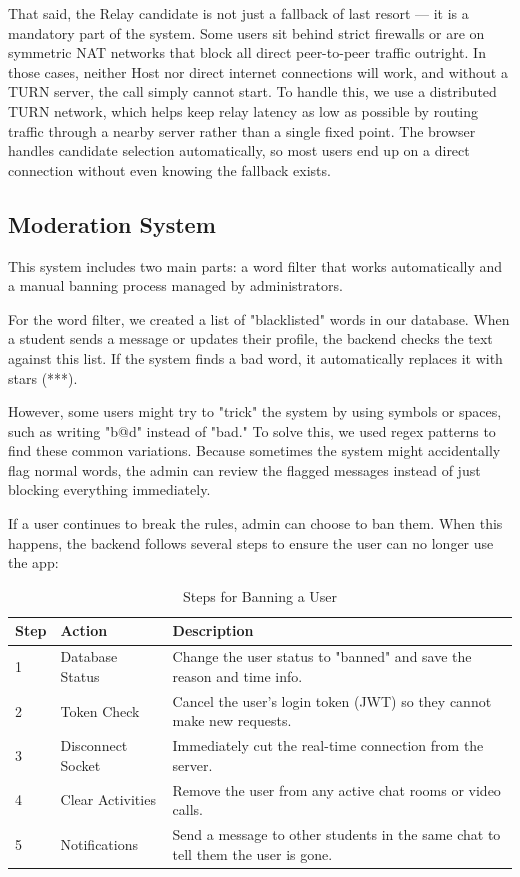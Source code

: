 \documentclass[a4paper,12pt]{report}
\begin{document}
That said, the Relay candidate is not just a fallback of last resort — it is a mandatory part of the system. Some users sit behind strict firewalls or are on symmetric NAT networks that block all direct peer-to-peer traffic outright. In those cases, neither Host nor direct internet connections will work, and without a TURN server, the call simply cannot start. To handle this, we use a distributed TURN network, which helps keep relay latency as low as possible by routing traffic through a nearby server rather than a single fixed point. The browser handles candidate selection automatically, so most users end up on a direct connection without even knowing the fallback exists.


\subsection{Moderation System}

This system includes two main parts: a word filter that works automatically and a manual banning process managed by administrators.

For the word filter, we created a list of "blacklisted" words in our database. When a student sends a message or updates their profile, the backend checks the text against this list. If the system finds a bad word, it automatically replaces it with stars (***). 

However, some users might try to "trick" the system by using symbols or spaces, such as writing "b@d" instead of "bad." To solve this, we used regex patterns to find these common variations. Because sometimes the system might accidentally flag normal words, the admin can review the flagged messages instead of just blocking everything immediately.

If a user continues to break the rules, admin can choose to ban them. When this happens, the backend follows several steps to ensure the user can no longer use the app:

\begin{table}[H]
\centering
\begin{tabular}{|p{1cm}|p{3.5cm}|p{9.5cm}|}
\hline
\textbf{Step} & \textbf{Action} & \textbf{Description} \\
\hline
1 & Database Status & Change the user status to "banned" and save the reason and time info. \\
\hline
2 & Token Check & Cancel the user's login token (JWT) so they cannot make new requests. \\
\hline
3 & Disconnect Socket & Immediately cut the real-time connection from the server. \\
\hline
4 & Clear Activities & Remove the user from any active chat rooms or video calls. \\
\hline
5 & Notifications & Send a message to other students in the same chat to tell them the user is gone. \\
\hline
\end{tabular}
\caption{Steps for Banning a User}
\label{tab:ban_process}
\end{table}
\end{document}
